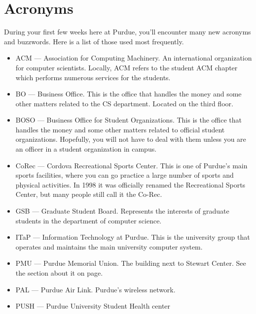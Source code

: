 \section{Acronyms}

During your first few weeks here at Purdue, you'll encounter many new acronyms and buzzwords. Here is a list of those used most frequently.

\begin{itemize}
	\item ACM --- Association for Computing Machinery. An international organization for computer scientists. Locally, ACM refers to the student ACM chapter which performs numerous services for the students.

	\item BO --- Business Office. This is the office that handles the money and some other matters related to the CS department. Located on the third floor.

	\item BOSO --- Business Office for Student Organizations. This is the office that handles the money and some other matters related to official student organizations. Hopefully, you will not have to deal with them unless you are an officer in a student organization in campus.

	\item CoRec --- Cordova Recreational Sports Center. This is one of Purdue's main sports facilities, where you can go practice a large number of sports and physical activities. In 1998 it was officially renamed the Recreational Sports Center, but many people still call it the Co-Rec.

	\item GSB --- Graduate Student Board. Represents the interests of graduate students in the department of computer science.

	\item ITaP --- Information Technology at Purdue. This is the university group that operates and maintains the main university computer system.

	\item PMU --- Purdue Memorial Union. The building next to Stewart Center. See the section about it on page.

	\item PAL --- Purdue Air Link. Purdue's wireless network.

	\item PUSH --- Purdue University Student Health center

\end{itemize}